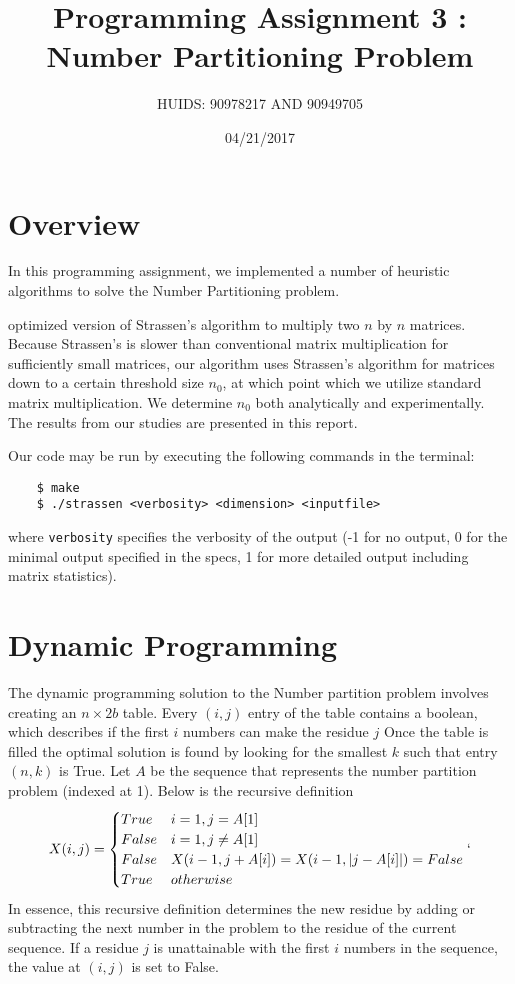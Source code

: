 \documentclass[a4paper]{article}
\title{Programming Assignment 3 : Number Partitioning Problem}
\author{HUIDS: 90978217 AND 90949705}
\date{04/21/2017}
\begin{document}
	
	\maketitle
	
	\section{Overview}
	In this programming assignment, we implemented a number of heuristic algorithms to solve the Number Partitioning problem.
	
	optimized version of Strassen's algorithm to multiply two $n$ by $n$ matrices. Because Strassen's is slower than conventional matrix multiplication for sufficiently small matrices, our algorithm uses Strassen's algorithm for matrices down to a certain threshold size $n_0$, at which point which we utilize standard matrix multiplication. We determine $n_0$ both analytically and experimentally. The results from our studies are presented in this report.
	
	Our code may be run by executing the following commands in the terminal:
	\begin{verbatim}
	$ make
	$ ./strassen <verbosity> <dimension> <inputfile>
	\end{verbatim}
	where \texttt{verbosity} specifies the verbosity of the output (-1 for no output, 0 for the minimal output specified in the specs, 1 for more detailed output including matrix statistics).
	
	\section{Dynamic Programming}
	The dynamic programming solution to the Number partition problem involves creating an $n \times 2b$ table. Every $(i,j)$ entry of the table contains a boolean, which describes if the first $i$ numbers can make the residue $j$  Once the table is filled the optimal solution is found by looking for the smallest $k$ such that entry $(n,k)$ is True. Let $A$ be the sequence that represents the number partition problem (indexed at 1). Below is the recursive definition
	\[X(i,j) = 
	\begin{cases}
	True & i = 1, j = A[1]\\
	False & i = 1, j \neq A[1] \\ 
	False & X(i-1, j + A[i]) = X(i-1, |j - A[i]|) = False \\
	True & otherwise
	\end{cases}`
	\]
	In essence, this recursive definition determines the new residue by adding or subtracting the next number in the problem to the residue of the current sequence. If a residue $j$ is unattainable with the first $i$ numbers in the sequence, the value at $(i,j)$ is set to False. 
	
\end{document}
